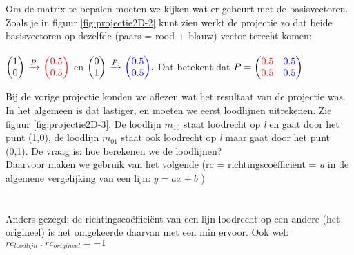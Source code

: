 \documentclass[hidelinks, a4wide, 12pt,  twoside]{book}
\begin{document}

Om de matrix te bepalen moeten we kijken wat er gebeurt met de basisvectoren. 	
Zoals je in figuur \ref{fig:projectie2D-2} kunt zien werkt de projectie zo dat beide basisvectoren op dezelfde (paars = rood + blauw) vector terecht komen:\\ \\
$ \vectwee{1}{0}  \  \xrightarrow{P}  \   \vectwee[red]{0.5}{0.5} $ \quad en \quad 
$ \vectwee{0}{1}  \  \xrightarrow{P}  \   \vectwee[blue]{0.5}{0.5}. $ 
\quad Dat betekent dat $ P = \begin{pmatrix} {\color{red}0.5}&{\color{blue}0.5} \\ {\color{red}0.5}&{\color{blue}0.5} \end{pmatrix} $



Bij de vorige projectie konden we aflezen wat het resultaat van de projectie was. In het algemeen is dat lastiger, en moeten we eerst loodlijnen uitrekenen. Zie figuur  \ref{fig:projectie2D-3}. De loodlijn $ m_{10} $ staat loodrecht op\textit{ l} en gaat door het punt (1,0), de loodlijn $ m_{01} $ staat ook loodrecht op \textit{l} maar gaat door het punt (0,1). De vraag is: hoe berekenen we de loodlijnen? \\ Daarvoor maken we gebruik van het volgende  (rc = richtingscoëfficiënt = \textit{a} in de algemene vergelijking van een lijn: $ y = ax + b $ )\\ \\ 

 \\ Anders gezegd: de richtingscoëfficiënt van een lijn loodrecht op een andere (het origineel) is het omgekeerde daarvan met een min ervoor. 
Ook wel: $ rc_{loodlijn}\ . \ rc_{origineel} = -1 $\\ \\

\\
\end{document}

